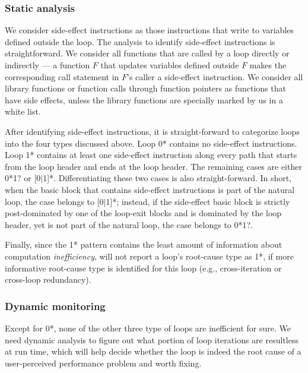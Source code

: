 \subsubsection{Static analysis}
\label{sec:6_s_workless}

We consider side-effect instructions as those instructions that write to
variables defined outside the loop. The analysis to identify side-effect
instructions is straightforward. We consider all functions that are called
by a loop directly or indirectly --- a function $F$ that updates variables
defined outside $F$ makes the corresponding call statement in $F$'s
caller a side-effect instruction.
We consider all library functions or function calls through function pointers 
as functions that have side effects, 
unless the library functions are specially marked by us in a white list.

After identifying side-effect instructions, it is straight-forward to
categorize loops into the four types discussed above.
Loop 0* contains no side-effect instructions. 
Loop 1* contains at least one side-effect instruction along every path that
starts from the loop header and ends at the loop header.
The remaining cases are either 
0*1? or [0$|$1]*. 
Differentiating these two cases is also straight-forward.
In short, when the basic block that contains side-effect instructions
is part of the natural loop, the case
belongs to [0$|$1]*; instead, if the side-effect basic block is strictly post-dominated
by one of the loop-exit blocks and is dominated by the loop header, yet is
not part of the natural loop, the case belongs to 0*1?.

Finally, since the 1* pattern contains the least amount of information
about computation \textit{inefficiency}, \Tool will not report a loop's
root-cause type as 1*, if more informative root-cause type is identified 
for this loop (e.g., cross-iteration or cross-loop redundancy).

\subsubsection{Dynamic monitoring}
\label{sec:6_d_workless}

Except for 0*, none of the other three type of loops are inefficient for sure.
We need dynamic analysis to figure out what portion of loop iterations are
resultless at run time, which will help decide whether the loop is indeed
the root cause of a user-perceived performance problem and worth fixing.

